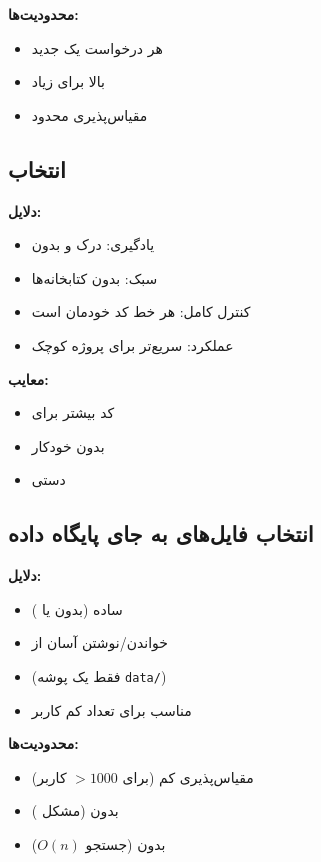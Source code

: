 \documentclass[12pt,a4paper]{article}
\begin{document}
	\textbf{محدودیت‌ها:}
	\begin{itemize}
		\item هر درخواست یک  جدید
		\item {} بالا برای  زیاد
		\item مقیاس‌پذیری محدود
	\end{itemize}
	
	\subsection{انتخاب }
	\textbf{دلایل:}
	\begin{itemize}
		\item یادگیری: درک  و  بدون 
		\item سبک: بدون  کتابخانه‌ها
		\item کنترل کامل: هر خط کد خودمان است
		\item عملکرد: سریع‌تر برای پروژه کوچک
	\end{itemize}
	
	\textbf{معایب:}
	\begin{itemize}
		\item کد بیشتر برای 
		\item بدون  خودکار
		\item {} دستی
	\end{itemize}
	
	\subsection{انتخاب فایل‌های  به جای پایگاه داده}
	\textbf{دلایل:}
	\begin{itemize}
		\item {} ساده (بدون  یا )
		\item خواندن/نوشتن آسان از 
		\item {} (فقط یک پوشه \texttt{data/})
		\item مناسب برای تعداد کم کاربر
	\end{itemize}
	
	\textbf{محدودیت‌ها:}
	\begin{itemize}
		\item مقیاس‌پذیری کم (برای $>1000$ کاربر)
		\item بدون  (مشکل )
		\item بدون  (جستجو $O(n)$)
	\end{itemize}
	
\end{document}
